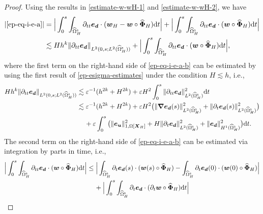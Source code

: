 \documentclass[11pt,reqno]{amsart}
\theoremstyle{definition}
\theoremstyle{plain}
\numberwithin{theorem}{section}
\numberwithin{proposition}{section}
\numberwithin{lemma}{section}
\numberwithin{equation}{section}
\newcommand{\bs}[1]{\boldsymbol{#1}}
\newcommand{\uu}[1]  {{\bs{#1}} }
\newcommand{\dep}{{{\bs{d}}}}
\newcommand{\grad}   { \uu{\nabla}    }
\def\d{\mathrm{d}}
\newcommand{\bw}{{\bs w}}
\renewcommand{\(}{\bigl(}
\renewcommand{\)}{\bigr)}
\begin{document}
\begin{proof}
Using the results in \eqref{estimate-w-wH-1} and \eqref{estimate-w-wH-2}, we have  
\begin{align}\label{ep-eq-i-e-a-b}
|\eqref{ep-eq-i-e-a}| 
&= \Big| \int_0^s \int_{\widehat{\Omega}^{\rm s}_H} \partial_{tt}{\bs e}_{\dep} \cdot (\bw_H - {\bs w}\circ \widehat{\bs\Phi}_H) \d t \Big| 
+ \Big| \int_0^s \int_{\widehat{\Omega}^{\rm s}_H} \partial_{tt}{\bs e}_{\dep} \cdot ({\bs w}\circ \widehat{\bs\Phi}_H) \d t \Big| \notag\\ 
&\lesssim Hh^k \|\partial_{tt}{\bs e}_{\dep} \|_{L^2(0,s;L^2(\widehat\Omega^{\rm s}_H))} 
+ \Big| \int_0^s \int_{\widehat{\Omega}^{\rm s}_H} \partial_{tt}{\bs e}_{\dep} \cdot ({\bs w}\circ \widehat{\bs\Phi}_H) \d t \Big| , 
\end{align}
where the first term on the right-hand side of \eqref{ep-eq-i-e-a-b} can be estimated by using the first result of \eqref{ep-esigma-estimates} under the condition $H\lesssim h$, i.e., 
\begin{align}
Hh^k \|\partial_{tt}{\bs e}_{\dep} \|_{L^2(0,s;L^2(\widehat\Omega^{\rm s}_H))}  
&\lesssim \varepsilon^{-1}(h^{2k} + H^{2k} )
+ \varepsilon H^2 \int_0^s \|\partial_{tt}{\bs e}_{\dep} \|_{L^2(\widehat{\Omega}^{\rm s}_H)}^2 \d t  \notag\\
&\lesssim \varepsilon^{-1}(h^{2k} + H^{2k}) 
+ \varepsilon H^2\big( \|\grad{\bs e}_{\bs d}(s)\|_{L^2(\widehat\Omega^{\rm s}_H)}^2 + \|\partial_t{\bs e}_{\bs d}(s)\|_{L^2(\widehat\Omega^{\rm s}_H)}^2 \big)\notag\\
&\quad\, 
+  \varepsilon\int_0^s \big(\| {\bs e}_{\bs u}  \|_{1,\Omega[{\bs X}_H]}^2 + H\|\partial_t{\bs e}_\dep\|_{L^2(\widehat{\Omega}^{\rm s}_H)}^2 
+ \|{\bs e}_\dep\|_{H^1(\widehat{\Omega}^{\rm s}_H)}^2\big) \d t . \notag
\end{align}
The second term on the right-hand side of \eqref{ep-eq-i-e-a-b} can be estimated via integration by parts in time, i.e.,
\begin{align}
\Big| \int_0^s \int_{\widehat{\Omega}^{\rm s}_H} \partial_{tt}{\bs e}_{\dep} \cdot ({\bs w}\circ \widehat{\bs\Phi}_H) \d t \Big|
&\le \Big|\int_{\widehat{\Omega}^{\rm s}_H} \partial_t {\bs e}_{\dep}(s) \cdot ({\bs w}(s)\circ\widehat{\bs\Phi}_H) - \int_{\widehat{\Omega}^{\rm s}_H} \partial_t {\bs e}_{\dep}(0) \cdot  ({\bs w}(0)\circ\widehat{\bs\Phi}_H) \Big| \notag\\
&\quad\, + \Big| \int_0^s \int_{\widehat{\Omega}^{\rm s}_H} \partial_t {\bs e}_{\dep} \cdot (\partial_t {\bs w}\circ\widehat{\bs\Phi}_H) \d t \Big| \notag\\

\end{align}
\end{proof}
\end{document}
